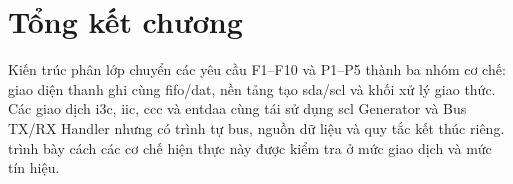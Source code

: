 \section{Tổng kết chương}

Kiến trúc phân lớp chuyển các yêu cầu F1--F10 và P1--P5 thành ba nhóm cơ chế: giao diện thanh ghi cùng \gls{fifo}/\gls{dat}, nền tảng tạo \gls{sda}/\gls{scl} và khối xử lý giao thức. Các giao dịch \gls{i3c}, \gls{iic}, \gls{ccc} và \gls{entdaa} cùng tái sử dụng \gls{scl} Generator và Bus TX/RX Handler nhưng có trình tự bus, nguồn dữ liệu và quy tắc kết thúc riêng.  trình bày cách các cơ chế hiện thực này được kiểm tra ở mức giao dịch và mức tín hiệu.

